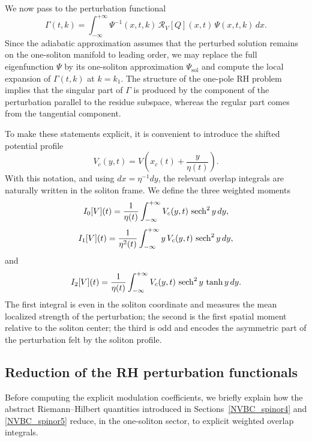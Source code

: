 \documentclass[11pt]{amsart}
\newcommand{\sech}{\mathop{\rm sech}\nolimits}
\theoremstyle{definition}
\numberwithin{equation}{section}
\begin{document}
We now pass to the perturbation functional
\begin{equation}
\Gamma(t,k)=\int_{-\infty}^{+\infty}\Psi^{-1}(x,t,k)\,\mathcal{R}_V[Q](x,t)\,\Psi(x,t,k)\,dx.
\label{eq:GammaDefinition7}
\end{equation}
Since the adiabatic approximation assumes that the perturbed solution remains on the one-soliton manifold to leading order, we may replace the full eigenfunction $\Psi$ by its one-soliton approximation $\Psi_{\mathrm{sol}}$ and compute the local expansion of $\Gamma(t,k)$ at $k=k_1$. The structure of the one-pole RH problem implies that the singular part of $\Gamma$ is produced by the component of the perturbation parallel to the residue subspace, whereas the regular part comes from the tangential component.

To make these statements explicit, it is convenient to introduce the shifted potential profile
\begin{equation}
V_c(y,t)=V\!\left(x_c(t)+\frac{y}{\eta(t)}\right).
\label{eq:ShiftedPotential7}
\end{equation}
With this notation, and using $dx=\eta^{-1}dy$, the relevant overlap integrals are naturally written in the soliton frame. We define the three weighted moments
\begin{equation}
I_0[V](t)=\frac{1}{\eta(t)}\int_{-\infty}^{+\infty}V_c(y,t)\,\sech^2 y\,dy,
\label{eq:I0Def7}
\end{equation}
\begin{equation}
I_1[V](t)=\frac{1}{\eta^2(t)}\int_{-\infty}^{+\infty}y\,V_c(y,t)\,\sech^2 y\,dy,
\label{eq:I1Def7}
\end{equation}
and
\begin{equation}
I_2[V](t)=\frac{1}{\eta(t)}\int_{-\infty}^{+\infty}V_c(y,t)\,\sech^2 y\,\tanh y\,dy.
\label{eq:I2Def7}
\end{equation}
The first integral is even in the soliton coordinate and measures the mean localized strength of the perturbation; the second is the first spatial moment relative to the soliton center; the third is odd and encodes the asymmetric part of the perturbation felt by the soliton profile.

\subsection*{Reduction of the RH perturbation functionals}

Before computing the explicit modulation coefficients, we briefly explain how the abstract Riemann--Hilbert quantities introduced in Sections~\ref{NVBC_spinor4} and \ref{NVBC_spinor5} reduce, in the one-soliton sector, to explicit weighted overlap integrals.
\end{document}
